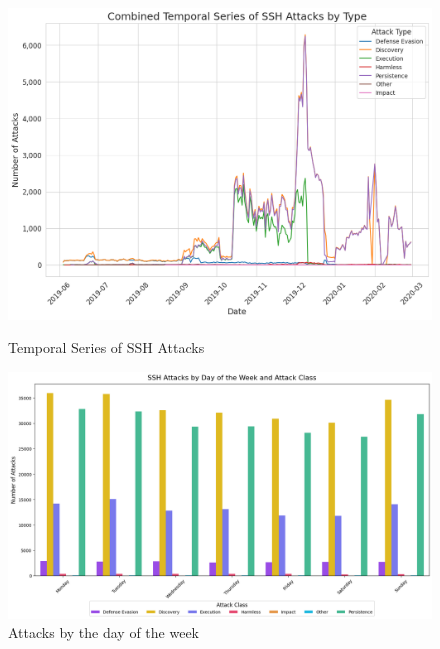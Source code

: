         \begin{figure}[h]
            \centering
            \begin{minipage}[c]{0.47\textwidth}
                \centering
                \includegraphics[width=\textwidth]{../figures/plots/section1/combined_temporal_series_of_ssh_attacks_by_type.png}
                \caption{Temporal Series of SSH Attacks}
                \label{fig:temporal-analysis}
            \end{minipage}
            \hfill
            \begin{minipage}[c]{0.47\textwidth}
                \centering
                \vspace{0.55cm}
                \includegraphics[width=\textwidth]{../figures/plots/section1/ssh_attacks_by_day_of_the_week_and_attack_class.png}
                \vspace{0.15cm}
                \caption{Attacks by the day of the week}
                \label{fig:attacks-day-of-the-week}
            \end{minipage}
        \end{figure}

